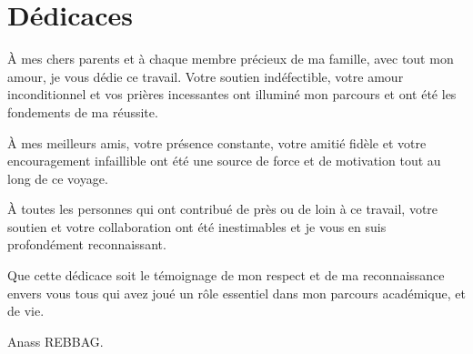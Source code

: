 \chapter*{Dédicaces}


\hspace{\parindent}À mes chers parents et à chaque membre précieux de ma famille, avec tout mon amour, je vous dédie ce travail. Votre soutien indéfectible, votre amour inconditionnel et vos prières incessantes ont illuminé mon parcours et ont été les fondements de ma réussite.

\vspace{1\baselineskip}
À mes meilleurs amis, votre présence constante, votre amitié fidèle et votre encouragement infaillible ont été une source de force et de motivation tout au long de ce voyage.

\vspace{1\baselineskip}
À toutes les personnes qui ont contribué de près ou de loin à ce travail, votre soutien et votre collaboration ont été inestimables et je vous en suis profondément reconnaissant.

\vspace{1\baselineskip}
Que cette dédicace soit le témoignage de mon respect et de ma reconnaissance envers vous tous qui avez joué un rôle essentiel dans mon parcours académique, et de vie.

\par   %


\vspace{\baselineskip}
 Anass REBBAG.


